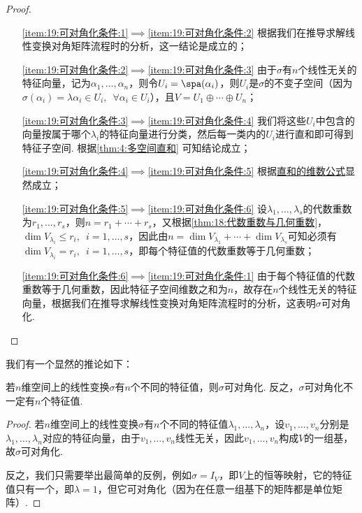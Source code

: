 \begin{proof}
    \begin{itemize}
        \item[\ref*{item:19:可对角化条件:1}$\implies$\ref*{item:19:可对角化条件:2}] 根据我们在推导求解线性变换对角矩阵流程时的分析，这一结论是成立的；

        \item[\ref*{item:19:可对角化条件:2}$\implies$\ref*{item:19:可对角化条件:3}] 由于$\sigma$有$n$个线性无关的特征向量，记为$\alpha_1,\ldots,\alpha_n$，则令$U_i=\spa(\alpha_i)$，则$U_i$是$\sigma$的不变子空间（因为$\sigma(\alpha_i)=\lambda\alpha_i\in U_i,\enspace\forall\alpha_i\in U_i$），且$V=U_1\oplus\cdots\oplus U_n$；

        \item[\ref*{item:19:可对角化条件:3}$\implies$\ref*{item:19:可对角化条件:4}] 我们将这些$U_i$中包含的向量按属于哪个$\lambda_i$的特征向量进行分类，然后每一类内的$U_i$进行直和即可得到特征子空间. 根据\autoref{thm:4:多空间直和} 可知结论成立；

        \item[\ref*{item:19:可对角化条件:4}$\implies$\ref*{item:19:可对角化条件:5}] 根据\hyperref[thm:4:直和等价命题]{直和的维数公式}显然成立；

        \item[\ref*{item:19:可对角化条件:5}$\implies$\ref*{item:19:可对角化条件:6}] 设$\lambda_1,\ldots,\lambda_s$的代数重数为$r_1,\ldots,r_s$，则$n=r_1+\cdots+r_s$，又根据\autoref{thm:18:代数重数与几何重数}，$\dim V_{\lambda_i}\leqslant r_i,\enspace i=1,\ldots,s$，因此由$n=\dim V_{\lambda_1}+\cdots+\dim V_{\lambda_s}$可知必须有$\dim V_{\lambda_i}=r_i,\enspace i=1,\ldots,s$，即每个特征值的代数重数等于几何重数；

        \item[\ref*{item:19:可对角化条件:6}$\implies$\ref*{item:19:可对角化条件:1}] 由于每个特征值的代数重数等于几何重数，因此特征子空间维数之和为$n$，故存在$n$个线性无关的特征向量，根据我们在推导求解线性变换对角矩阵流程时的分析，这表明$\sigma$可对角化.
    \end{itemize}
\end{proof}

我们有一个显然的推论如下：
\begin{corollary}\label{cor:19:可对角化必要条件}
    若$n$维空间上的线性变换$\sigma$有$n$个不同的特征值，则$\sigma$可对角化. 反之，$\sigma$可对角化不一定有$n$个特征值.
\end{corollary}

\begin{proof}
    若$n$维空间上的线性变换$\sigma$有$n$个不同的特征值$\lambda_1,\ldots,\lambda_n$，设$v_1,\ldots,v_n$分别是$\lambda_1,\ldots,\lambda_n$对应的特征向量，由于$v_1,\ldots,v_n$线性无关，因此$v_1,\ldots,v_n$构成$V$的一组基，故$\sigma$可对角化.

    反之，我们只需要举出最简单的反例，例如$\sigma=I_V$，即$V$上的恒等映射，它的特征值只有一个，即$\lambda=1$，但它可对角化（因为在任意一组基下的矩阵都是单位矩阵）.
\end{proof}


